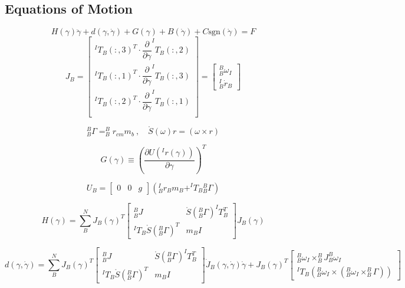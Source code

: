\documentclass[12pt]{report}
\begin{document}
\subsection{Equations of Motion}
\begin{equation}
  H(\gamma)\ddot{\gamma}+d(\gamma,\dot{\gamma})+G(\gamma)+B(\dot{\gamma})+C\text{sgn}(\dot{\gamma}) = F
\end{equation}
\[
J_B =
\begin{bmatrix}
  ^IT_B(:,3)^T \cdot \dfrac{\partial}{\partial\gamma}^IT_B(:,2) \\
  ^IT_B(:,1)^T \cdot \dfrac{\partial}{\partial\gamma}^IT_B(:,3) \\
  ^IT_B(:,2)^T \cdot \dfrac{\partial}{\partial\gamma}^IT_B(:,1) \\
\end{bmatrix}
=
\begin{bmatrix}
  ^B_B\omega_I\\
  ^I_B\dot{r}_B
\end{bmatrix}
\]

\[
^B_B\Gamma = ^B_Br_{cm}m_b~,\quad \mathring{S}(\omega)r=(\omega\times r)
\]

\[
G(\gamma) \equiv \left(\frac{\partial U(^Ir(\gamma))}{\partial\gamma}\right)^T
\]

\[
U_B = \begin{bmatrix} 0 & 0 & g\end{bmatrix}\left(^I_Br_Bm_B + ^IT_B{}_B^B\Gamma\right)
\]

\begin{equation}
  \renewcommand{\arraystretch}{1.5}
  H(\gamma) = \sum_B^N J_B(\gamma)^T
  \begin{bmatrix}
    ^B_BJ & \mathring{S}(^B_B\Gamma) ^IT_B^T\\
    ^IT_B\mathring{S}(^B_B\Gamma)^T & m_BI
  \end{bmatrix}
  J_B(\gamma)
\end{equation}

\begin{equation}
  \renewcommand{\arraystretch}{1.5}
  d(\gamma,\dot{\gamma}) = \sum_B^N J_B(\gamma)^T
  \begin{bmatrix}
    ^B_BJ & \mathring{S}(^B_B\Gamma) ^IT_B^T\\
    ^IT_B\mathring{S}(^B_B\Gamma)^T & m_BI
  \end{bmatrix}
  \dot{J}_B(\gamma,\dot{\gamma})\dot{\gamma}+J_B(\gamma)^T
  \begin{bmatrix}
    ^B_B\omega_I \times ^B_BJ ^B_B\omega_I \\
    ^IT_B\left(^B_B\omega_I\times(^B_B\omega_I\times^B_B\Gamma)\right)
  \end{bmatrix}
\end{equation}
\newpage
\end{document}
